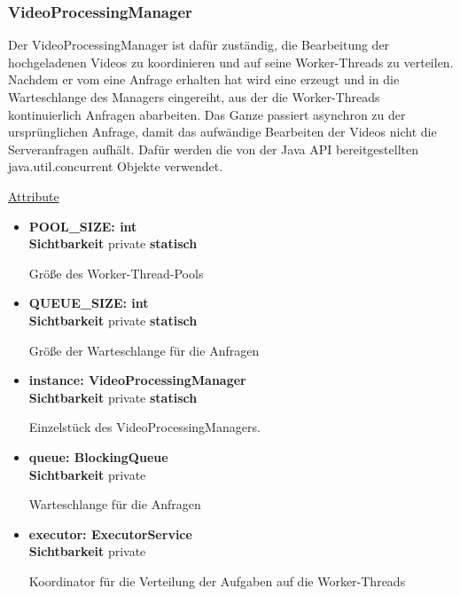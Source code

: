 \subsubsection{VideoProcessingManager} \label{service:klasse:VideoProcessingManager}
Der VideoProcessingManager ist dafür zuständig, die Bearbeitung der hochgeladenen Videos zu koordinieren und auf seine Worker-Threads zu verteilen. Nachdem er vom  eine Anfrage erhalten hat wird eine  erzeugt und in die Warteschlange des Managers eingereiht, aus der die Worker-Threads kontinuierlich Anfragen abarbeiten. Das Ganze passiert asynchron zu der ursprünglichen Anfrage, damit das aufwändige Bearbeiten der Videos nicht die Serveranfragen aufhält. Dafür werden die von der Java API bereitgestellten java.util.concurrent Objekte verwendet. \newline

\underline{Attribute}
\begin{itemize}
\itemsep0pt
\item \textbf{POOL\_SIZE: int} \hfill\\ 
\textbf{Sichtbarkeit} private \newline
\textbf{statisch}

Größe des Worker-Thread-Pools

\item \textbf{QUEUE\_SIZE: int} \hfill\\ 
\textbf{Sichtbarkeit} private \newline
\textbf{statisch}

Größe der Warteschlange für die Anfragen

\item \textbf{instance: VideoProcessingManager} \hfill\\
\textbf{Sichtbarkeit} private \newline
\textbf{statisch}

Einzelstück des VideoProcessingManagers.

\item \textbf{queue: BlockingQueue} \hfill\\
\textbf{Sichtbarkeit} private 

Warteschlange für die Anfragen

\item \textbf{executor: ExecutorService} \hfill\\ 
\textbf{Sichtbarkeit} private

Koordinator für die Verteilung der Aufgaben auf die Worker-Threads
\end{itemize}

